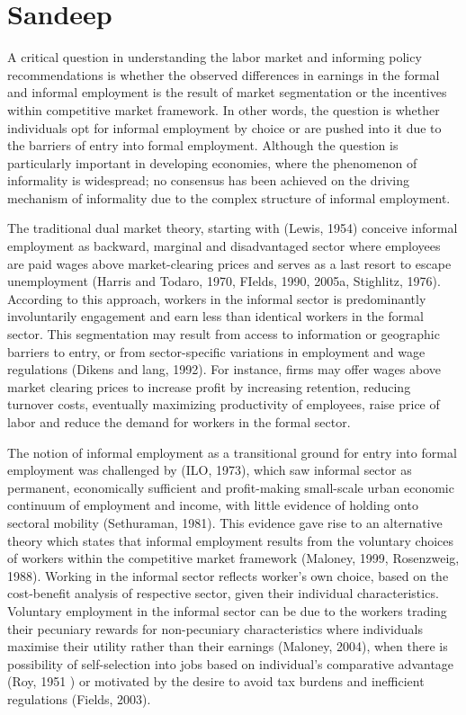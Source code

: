 \section{Sandeep}

A critical question in understanding the labor market and informing policy recommendations is whether the observed differences in earnings in the formal and informal employment is the result of market segmentation or the incentives within competitive market framework.  In other words, the question is whether individuals opt for informal employment by choice or are pushed into it due to the barriers of entry into formal employment. Although the question is particularly important in developing economies, where the phenomenon of informality is widespread; no consensus has been achieved on the driving mechanism of informality due to the complex structure of informal employment.

The traditional dual market theory, starting with (Lewis, 1954) conceive informal employment as backward, marginal and disadvantaged sector where employees are paid wages above market-clearing prices and serves as a last resort to escape unemployment (Harris and Todaro, 1970, FIelds, 1990, 2005a, Stighlitz, 1976). According to this approach, workers in the informal sector is predominantly involuntarily engagement  and earn less than identical workers in the formal sector. This segmentation may result from access to information or geographic barriers to entry, or from sector-specific variations in employment and wage regulations (Dikens and lang, 1992). For instance, firms may offer wages above market clearing prices to increase profit by increasing retention, reducing turnover costs, eventually maximizing productivity of employees, raise price of labor and reduce the demand for workers in the formal sector.      

The notion of informal employment as a transitional ground for entry into formal employment was challenged by (ILO, 1973), which saw informal sector as permanent, economically sufficient and profit-making small-scale urban economic continuum of employment and income, with little evidence of holding onto sectoral mobility (Sethuraman, 1981). This evidence gave rise to an alternative theory which states that informal employment results from the voluntary choices of workers within the competitive market framework (Maloney, 1999, Rosenzweig, 1988). Working in the informal sector reflects worker's own choice, based on the cost-benefit analysis of respective sector, given their individual characteristics. Voluntary employment in the informal sector can be due to the workers trading their pecuniary rewards for non-pecuniary characteristics where individuals maximise their utility rather than their earnings (Maloney, 2004),  when there is possibility of self-selection into jobs based on individual's comparative advantage (Roy, 1951 ) or motivated by the desire to avoid tax burdens and inefficient regulations (Fields, 2003).  

